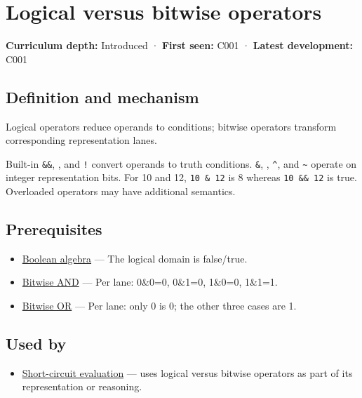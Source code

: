\hypertarget{appendix-fe6b457d68d8}{}
\section{Logical versus bitwise operators}\label{appendix-fe6b457d68d8-logical-versus-bitwise-operators}

\textbf{Curriculum depth:} Introduced · \textbf{First seen:} C001 · \textbf{Latest development:} C001

\subsection{Definition and mechanism}\label{appendix-fe6b457d68d8-definition-and-mechanism}

Logical operators reduce operands to conditions; bitwise operators transform corresponding representation lanes.

Built-in \texttt{\&\&}, \texttt{\textbar{}\textbar{}}, and \texttt{!} convert operands to truth conditions. \texttt{\&}, \texttt{\textbar{}}, \texttt{\^{}}, and \texttt{\textasciitilde{}} operate on integer representation bits. For 10 and 12, \texttt{10\ \&\ 12} is 8 whereas \texttt{10\ \&\&\ 12} is true. Overloaded operators may have additional semantics.

\subsection{Prerequisites}\label{appendix-fe6b457d68d8-prerequisites}

\begin{itemize}
\tightlist
\item
  \hyperref[appendix-24475e1596a8]{Boolean algebra} --- The logical domain is false/true.
\item
  \hyperref[appendix-68b52453737c]{Bitwise AND} --- Per lane: 0\&0=0, 0\&1=0, 1\&0=0, 1\&1=1.
\item
  \hyperref[appendix-a427ce8ce8a6]{Bitwise OR} --- Per lane: only 0 is 0; the other three cases are 1.
\end{itemize}

\subsection{Used by}\label{appendix-fe6b457d68d8-used-by}

\begin{itemize}
\tightlist
\item
  \hyperref[appendix-2e245a6fa8d3]{Short-circuit evaluation} --- uses logical versus bitwise operators as part of its representation or reasoning.
\end{itemize}

